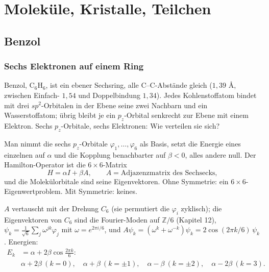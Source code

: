 \part{Moleküle, Kristalle, Teilchen}

\chapter{Benzol}

\section{Sechs Elektronen auf einem Ring}

\begin{merksatz}
Benzol, $\mathrm{C_6H_6}$, ist ein ebener Sechsring, alle C--C-Abstände gleich ($1{,}39$ \AA, zwischen Einfach- $1{,}54$ und Doppelbindung $1{,}34$). Jedes Kohlenstoffatom bindet mit drei $sp^{2}$-Orbitalen in der Ebene seine zwei Nachbarn und ein Wasserstoffatom; übrig bleibt je ein $p_z$-Orbital senkrecht zur Ebene mit einem Elektron. Sechs $p_z$-Orbitale, sechs Elektronen: Wie verteilen sie sich?

Man nimmt die sechs $p_z$-Orbitale $\varphi_1, \dots, \varphi_6$ als Basis, setzt die Energie eines einzelnen auf $\alpha$ und die Kopplung benachbarter auf $\beta < 0$, alles andere null. Der Hamilton-Operator ist die $6\times6$-Matrix
\[ H = \alpha I + \beta A,\qquad A = \text{Adjazenzmatrix des Sechsecks}, \]
und die Molekülorbitale sind seine Eigenvektoren. Ohne Symmetrie: ein $6\times6$-Eigenwertproblem. Mit Symmetrie: keines.

$A$ vertauscht mit der Drehung $C_6$ (sie permutiert die $\varphi_i$ zyklisch); die Eigenvektoren von $C_6$ sind die Fourier-Moden auf $\mathbb Z/6$ (Kapitel 12), $\psi_k = \frac1{\sqrt6}\sum_j\omega^{jk}\varphi_j$ mit $\omega = e^{2\pi i/6}$, und $A\psi_k = (\omega^{k} + \omega^{-k})\psi_k = 2\cos(2\pi k/6)\,\psi_k$. Energien:
\begin{align*} E_k &= \alpha + 2\beta\cos\frac{2\pi k}6\colon\\ &\alpha + 2\beta\ (k = 0),\quad\alpha + \beta\ (k = \pm1),\quad\alpha - \beta\ (k = \pm2),\quad\alpha - 2\beta\ (k = 3). \end{align*}


\end{merksatz}
